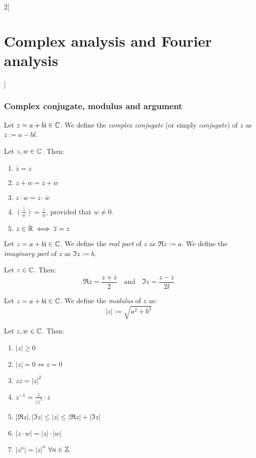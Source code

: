 \documentclass[../../../main.tex]{subfiles}
\begin{document}
\begin{multicols}{2}[\section{Complex analysis and Fourier analysis}]
  \subsubsection{Complex conjugate, modulus and argument}
  \begin{definition}
    Let $z=a+b\mathrm{i}\in\mathbb{C}$. We define the \emph{complex conjugate} (or simply \emph{conjugate}) of $z$ as $\overline{z}:=a-b\ii$.
  \end{definition}
  \begin{prop}
    Let $z,w\in\mathbb{C}$. Then:
    \begin{enumerate}
      \item $\overline{\overline{z}}=z$
      \item $\overline{z+w}=\overline{z}+\overline{w}$
      \item $\overline{z\cdot w}=\overline{z}\cdot\overline{w}$
      \item $\displaystyle\overline{\left(\frac{z}{w}\right)}=\frac{\overline{z}}{\overline{w}}$, provided that $w\ne 0$.
      \item $z\in\mathbb{R}\iff \overline{z}=z$
    \end{enumerate}
  \end{prop}
  \begin{definition}
    Let $z=a+b\mathrm{i}\in\mathbb{C}$. We define the \emph{real part} of $z$ as $\Re z:=a$. We define the \emph{imaginary part} of $z$ as $\Im z:=b$.
  \end{definition}
  \begin{prop}
    Let $z\in\mathbb{C}$. Then: $$\Re z=\frac{z+\overline{z}}{2}\quad\text{and}\quad\Im z=\frac{z-\overline{z}}{2\ii}$$
  \end{prop}
  \begin{definition}
    Let $z=a+b\mathrm{i}\in\mathbb{C}$. We define the \emph{modulus} of $z$ as: $$|z|:=\sqrt{a^2+b^2}$$
  \end{definition}
  \begin{prop}
    Let $z,w\in\mathbb{C}$. Then:
    \begin{enumerate}
      \item $|z|\geq 0$
      \item $|z|=0\iff z=0$
      \item $z\overline{z}={|z|}^2$
      \item $z^{-1}=\frac{1}{{|z|}^2}\cdot\overline{z}$
      \item $|\Re z|,|\Im z|\leq |z|\leq|\Re z|+|\Im z|$
      \item $|z\cdot w|=|z|\cdot |w|$
      \item $|z^n|={|z|}^n$ $\forall n\in\mathbb{Z}$

\end{enumerate}
\end{prop}
\end{multicols}
\end{document}
